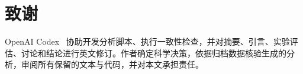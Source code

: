 \section*{致谢}

OpenAI Codex~\cite{b_openai_codex2026} 协助开发分析脚本、执行一致性检查，并对摘要、引言、实验评估、讨论和结论进行英文修订。作者确定科学决策，依据归档数据核验生成的分析，审阅所有保留的文本与代码，并对本文承担责任。




\EOD

\vfill


